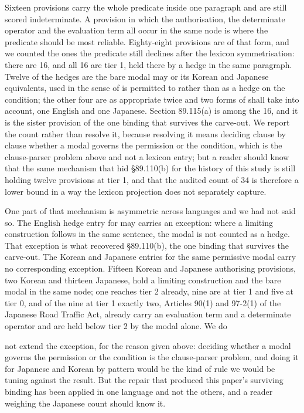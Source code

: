 Sixteen provisions carry the whole predicate inside one paragraph and are still scored indeterminate. A provision in which the authorisation, the determinate operator and the evaluation term all occur in the same node is where the predicate should be most reliable. Eighty-eight provisions are of that form, and we counted the ones the predicate still declines after the lexicon symmetrisation: there are 16, and all 16 are tier 1, held there by a hedge in the same paragraph. Twelve of the hedges are the bare modal may or its Korean and Japanese equivalents, used in the sense of is permitted to rather than as a hedge on the condition; the other four are as appropriate twice and two forms of shall take into account, one English and one Japanese. Section 89.115(a) is among the 16, and it is the sister provision of the one binding that survives the carve-out. We report the count rather than resolve it, because resolving it means deciding clause by clause whether a modal governs the permission or the condition, which is the clause-parser problem above and not a lexicon entry; but a reader should know that the same mechanism that hid \S{}89.110(b) for the history of this study is still holding twelve provisions at tier 1, and that the audited count of 34 is therefore a lower bound in a way the lexicon projection does not separately capture.

One part of that mechanism is asymmetric across languages and we had not said so. The English hedge entry for may carries an exception: where a limiting construction follows in the same sentence, the modal is not counted as a hedge. That exception is what recovered \S{}89.110(b), the one binding that survives the carve-out. The Korean and Japanese entries for the same permissive modal carry no corresponding exception. Fifteen Korean and Japanese authorising provisions, two Korean and thirteen Japanese, hold a limiting construction and the bare modal in the same node; one reaches tier 2 already, nine are at tier 1 and five at tier 0, and of the nine at tier 1 exactly two, Articles 90(1) and 97-2(1) of the Japanese Road Traffic Act, already carry an evaluation term and a determinate operator and are held below tier 2 by the modal alone. We do

not extend the exception, for the reason given above: deciding whether a modal governs the permission or the condition is the clause-parser problem, and doing it for Japanese and Korean by pattern would be the kind of rule we would be tuning against the result. But the repair that produced this paper's surviving binding has been applied in one language and not the others, and a reader weighing the Japanese count should know it.

